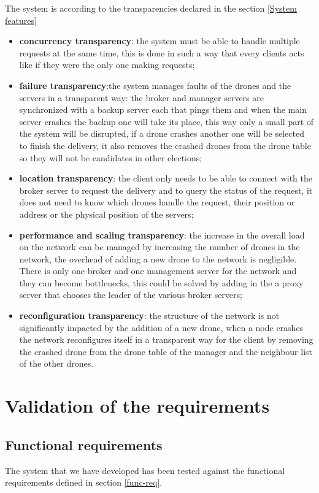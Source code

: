 \documentclass[a4paper, oneside]{memoir}
\begin{document}
The system is according to the transparencies declared in the section \ref{System features}
\begin{itemize}
	\item \textbf{concurrency transparency}: the system must be able to handle multiple requests at the same time, this is done in such a way that every clients acts like if they were the only one making requests;
	\item \textbf{failure transparency}:the system manages faults of the drones and the servers in a transparent way: the broker and manager servers are synchronized with a backup server each that pings them and when the main server crashes the backup one will take its place, this way only a small part of the system will be disrupted, if a drone crashes another one will be selected to finish the delivery, it also removes the crashed drones from the drone table so they will not be candidates in other elections;
	\item \textbf{location transparency}: the client only needs to be able to connect with the broker server to request the delivery and to query the status of the request, it does not need to know which drones handle the request, their position or address or the physical position of the servers;
	\item \textbf{performance and scaling transparency}: the increase in the overall load on the network can be managed by increasing the number of drones in the network, the overhead of adding a new drone to the network is negligible. There is only one broker and one management server for the network and they can become bottlenecks, this could be solved by adding in the a proxy server that chooses the leader of the various broker servers;
	\item \textbf{reconfiguration transparency}: the structure of the network is not significantly impacted by the addition of a new drone, when a node crashes the network reconfigures itself in a transparent way for the client by removing the crashed drone from the drone table of the manager and the neighbour list of the other drones.
\end{itemize}

\section{Validation of the requirements}

\subsection{Functional requirements}
The system that we have developed has been tested against the functional requirements defined in section \ref{func-req}.
\end{document}
